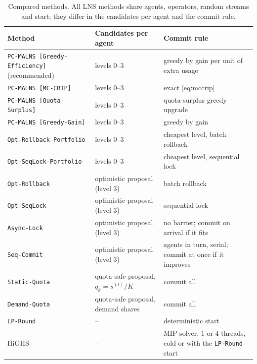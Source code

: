 \documentclass[a4paper,fleqn]{cas-sc}
\newcommand{\pge}{\texttt{PC-MALNS [Greedy-Efficiency]}}
\newcommand{\pmc}{\texttt{PC-MALNS [MC-CRIP]}}
\newcommand{\pqs}{\texttt{PC-MALNS [Quota-Surplus]}}
\newcommand{\pgg}{\texttt{PC-MALNS [Greedy-Gain]}}
\begin{document}
\begin{table}[pos=!htb]
\centering
\caption{Compared methods. All LNS methods share agents, operators, random streams and start; they differ in the candidates per agent and the commit rule.}
\label{tab:methods}
\footnotesize
\begin{tabular}{@{}llp{4.9cm}@{}}
\toprule
\textbf{Method} & \textbf{Candidates per agent} & \textbf{Commit rule} \\
\midrule
\pge{} (recommended) & levels $0$--$3$ & greedy by gain per unit of extra usage \\
\pmc{} & levels $0$--$3$ & exact \eqref{eq:mccrip} \\
\pqs{} & levels $0$--$3$ & quota-surplus greedy upgrade \\
\pgg{} & levels $0$--$3$ & greedy by gain \\
\texttt{Opt-Rollback-Portfolio} & levels $0$--$3$ & cheapest level, batch rollback \\
\texttt{Opt-SeqLock-Portfolio} & levels $0$--$3$ & cheapest level, sequential lock \\
\texttt{Opt-Rollback} & optimistic proposal (level $3$) & batch rollback \\
\texttt{Opt-SeqLock} & optimistic proposal (level $3$) & sequential lock \\
\texttt{Async-Lock} & optimistic proposal (level $3$) & no barrier; commit on arrival if it fits \\
\texttt{Seq-Commit} & optimistic proposal (level $3$) & agents in turn, serial; commit at once if it improves \\
\texttt{Static-Quota} & quota-safe proposal, $q_k = s^{(t)}/K$ & commit all \\
\texttt{Demand-Quota} & quota-safe proposal, demand shares & commit all \\
\texttt{LP-Round} & -- & deterministic start \\
HiGHS & -- & MIP solver, $1$ or $4$ threads, cold or with the \texttt{LP-Round} start \\
\bottomrule
\end{tabular}
\end{table}
\end{document}

